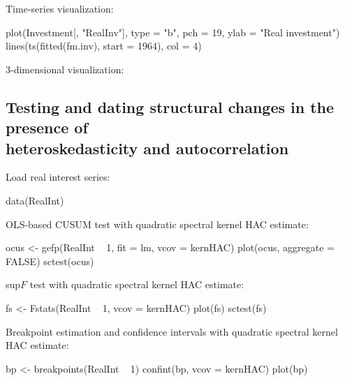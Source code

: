 \documentclass{Z}
\begin{document}
\begin{appendix}
Time-series visualization:
\begin{Schunk}
\begin{Sinput}
  plot(Investment[, "RealInv"], type = "b", pch = 19, ylab = "Real investment")
  lines(ts(fitted(fm.inv), start = 1964), col = 4)
\end{Sinput}
\end{Schunk}

3-dimensional visualization: %
\begin{Schunk}
\end{Schunk}

\subsection[Testing and dating structural changes in the presence of heteroskedasticity and autocorrelation]{Testing and dating structural changes in the presence of\\ heteroskedasticity and autocorrelation}

Load real interest series:
\begin{Schunk}
\begin{Sinput}
  data(RealInt)
\end{Sinput}
\end{Schunk}

OLS-based CUSUM test with quadratic spectral kernel HAC estimate:
\begin{Schunk}
\begin{Sinput}
  ocus <- gefp(RealInt ~ 1, fit = lm, vcov = kernHAC)
  plot(ocus, aggregate = FALSE)
  sctest(ocus)
\end{Sinput}
\end{Schunk}

sup$F$ test with quadratic spectral kernel HAC estimate:
\begin{Schunk}
\begin{Sinput}
  fs <- Fstats(RealInt ~ 1, vcov = kernHAC)
  plot(fs)
  sctest(fs)
\end{Sinput}
\end{Schunk}

Breakpoint estimation and confidence intervals
with quadratic spectral kernel HAC estimate:
\begin{Schunk}
\begin{Sinput}
  bp <- breakpoints(RealInt ~ 1)
  confint(bp, vcov = kernHAC)
  plot(bp)
\end{Sinput}
\end{Schunk}


\end{appendix}
\end{document}
